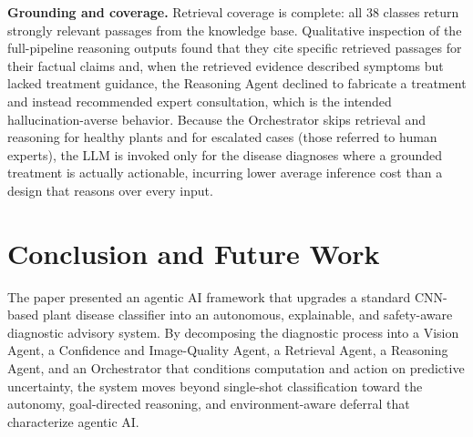 \documentclass[conference]{IEEEtran}
\begin{document}
\textbf{Grounding and coverage.} Retrieval coverage is complete: all 38 classes return strongly relevant passages from the knowledge base. Qualitative inspection of the full-pipeline reasoning outputs found that they cite specific retrieved passages for their factual claims and, when the retrieved evidence described symptoms but lacked treatment guidance, the Reasoning Agent declined to fabricate a treatment and instead recommended expert consultation, which is the intended hallucination-averse behavior. Because the Orchestrator skips retrieval and reasoning for healthy plants and for escalated cases (those referred to human experts), the LLM is invoked only for the disease diagnoses where a grounded treatment is actually actionable, incurring lower average inference cost than a design that reasons over every input.


\FloatBarrier

\section{Conclusion and Future Work}
\label{sec:conclusion}

The paper presented an agentic AI framework that upgrades a standard CNN-based plant disease classifier into an autonomous, explainable, and safety-aware diagnostic advisory system. By decomposing the diagnostic process into a Vision Agent, a Confidence and Image-Quality Agent, a Retrieval Agent, a Reasoning Agent, and an Orchestrator that conditions computation and action on predictive uncertainty, the system moves beyond single-shot classification toward the autonomy, goal-directed reasoning, and environment-aware deferral that characterize agentic AI. 




\end{document}
